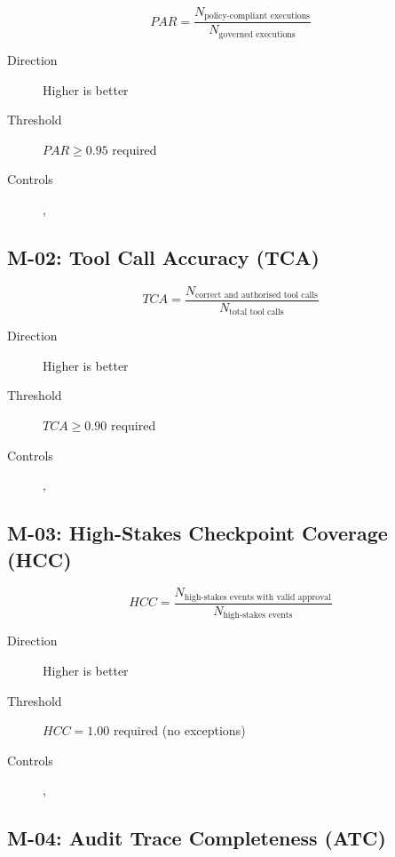 \begin{equation}
\boxed{
PAR = \frac{N_{\text{policy-compliant executions}}}{N_{\text{governed executions}}}
}
\end{equation}

\begin{description}
  \item[Direction] Higher is better
  \item[Threshold] $PAR \geq 0.95$ required
  \item[Controls] , 
\end{description}

\subsection{M-02: Tool Call Accuracy (TCA)}

\begin{equation}
\boxed{
TCA = \frac{N_{\text{correct and authorised tool calls}}}{N_{\text{total tool calls}}}
}
\end{equation}

\begin{description}
  \item[Direction] Higher is better
  \item[Threshold] $TCA \geq 0.90$ required
  \item[Controls] , 
\end{description}

\subsection{M-03: High-Stakes Checkpoint Coverage (HCC)}

\begin{equation}
\boxed{
HCC = \frac{N_{\text{high-stakes events with valid approval}}}{N_{\text{high-stakes events}}}
}
\end{equation}

\begin{description}
  \item[Direction] Higher is better
  \item[Threshold] $HCC = 1.00$ required (no exceptions)
  \item[Controls] , 
\end{description}

\subsection{M-04: Audit Trace Completeness (ATC)}

